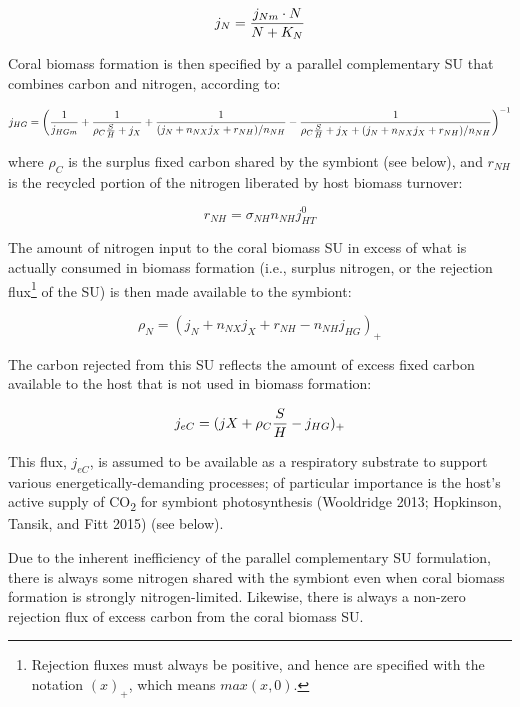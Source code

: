 \documentclass[]{elsarticle} %
\begin{document}
\begin{equation} j_N = {{j_{Nm} \cdot N} \over {N + K_N}} \end{equation}

Coral biomass formation is then specified by a parallel complementary SU
that combines carbon and nitrogen, according to:

\begin{equation} j_{HG} = \bigg({1 \over j_{HGm}} + {1 \over {\rho_C{S \over H} + j_X}} + {1 \over {(j_N + n_{NX}j_X + r_{NH}) / n_{NH}}} - {1 \over {{\rho_C{S \over H} + j_X} + (j_N + n_{NX}j_X + r_{NH}) / n_{NH}}}\bigg)^{-1} \end{equation}

where \(\rho_C\) is the surplus fixed carbon shared by the symbiont (see
below), and \(r_{NH}\) is the recycled portion of the nitrogen liberated
by host biomass turnover:

\begin{equation} r_{NH}=\sigma_{NH}n_{NH}j_{HT}^0 \end{equation}

The amount of nitrogen input to the coral biomass SU in excess of what
is actually consumed in biomass formation (i.e., surplus nitrogen, or
the rejection flux\footnote{Rejection fluxes must always be positive,
  and hence are specified with the notation \((x)_+\), which means
  \(max(x, 0)\).} of the SU) is then made available to the symbiont:

\begin{equation} \rho_N = (j_N + n_{NX}j_X + r_{NH} - n_{NH}j_{HG})_+ \end{equation}

The carbon rejected from this SU reflects the amount of excess fixed
carbon available to the host that is not used in biomass formation:

\begin{equation} j_{eC} = (jX + \rho_C{S \over H} - j_{HG})_+ \end{equation}

This flux, \(j_{eC}\), is assumed to be available as a respiratory
substrate to support various energetically-demanding processes; of
particular importance is the host's active supply of CO\textsubscript{2}
for symbiont photosynthesis (Wooldridge 2013; Hopkinson, Tansik, and
Fitt 2015) (see below).

Due to the inherent inefficiency of the parallel complementary SU
formulation, there is always some nitrogen shared with the symbiont even
when coral biomass formation is strongly nitrogen-limited. Likewise,
there is always a non-zero rejection flux of excess carbon from the
coral biomass SU.
\end{document}
